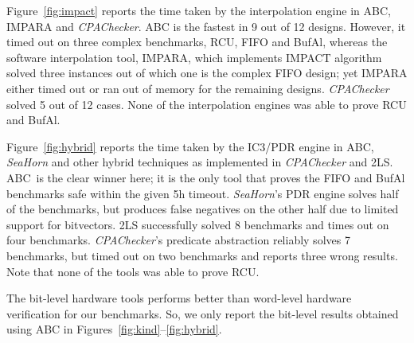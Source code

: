  Figure~\ref{fig:impact} reports
the time taken by the interpolation engine in ABC, \textsc{IMPARA}
and \emph{CPAChecker}. ABC is the fastest in 9 out of 12
designs. However, it timed out on three complex benchmarks, RCU, FIFO
and BufAl, whereas the software interpolation tool, \textsc{IMPARA},
which implements IMPACT algorithm solved three instances out of which
one is the complex FIFO design; yet \textsc{IMPARA} either timed out or
ran out of memory for the remaining designs.  \emph{CPAChecker} solved
5 out of 12 cases.  None of the interpolation engines was able to
prove RCU and BufAl.

 Figure~\ref{fig:hybrid}
reports the time taken by the IC3/PDR engine in ABC, \emph{SeaHorn}
and other hybrid techniques as implemented in \emph{CPAChecker} and
\textsc{2LS}. ABC~is the clear winner here; it is the only tool that
proves the FIFO and BufAl benchmarks safe within the given 5h timeout.
\emph{SeaHorn}'s PDR engine solves half of the benchmarks, but
produces false negatives on the other half due to limited support for
bitvectors. \textsc{2LS} successfully solved 8 benchmarks and times 
out on four benchmarks.  \emph{CPAChecker}'s predicate abstraction reliably
solves 7 benchmarks, but timed out on two benchmarks and reports three
wrong results. Note that none of the tools was able to prove RCU.

The bit-level hardware tools performs better than word-level hardware 
verification for our benchmarks.  So, we only report the bit-level results 
obtained using ABC in Figures~\ref{fig:kind}--\ref{fig:hybrid}.



